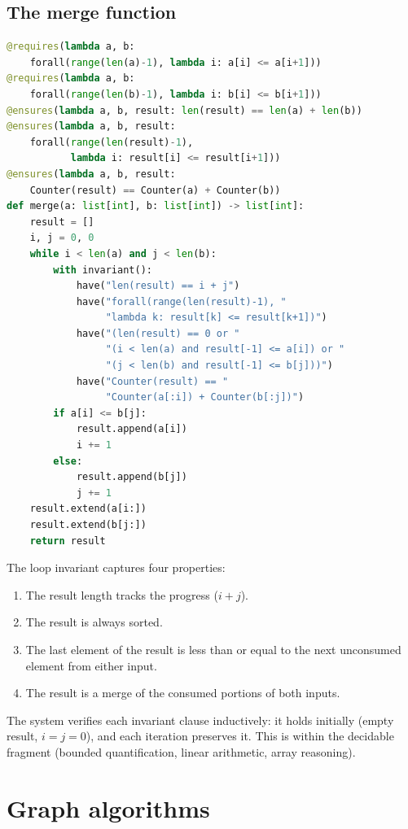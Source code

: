 \documentclass[11pt]{report}
\theoremstyle{definition}
\theoremstyle{plain}
\begin{document}
\subsection{The merge function}

\begin{lstlisting}[style=deppy,language=Python]
@requires(lambda a, b:
    forall(range(len(a)-1), lambda i: a[i] <= a[i+1]))
@requires(lambda a, b:
    forall(range(len(b)-1), lambda i: b[i] <= b[i+1]))
@ensures(lambda a, b, result: len(result) == len(a) + len(b))
@ensures(lambda a, b, result:
    forall(range(len(result)-1),
           lambda i: result[i] <= result[i+1]))
@ensures(lambda a, b, result:
    Counter(result) == Counter(a) + Counter(b))
def merge(a: list[int], b: list[int]) -> list[int]:
    result = []
    i, j = 0, 0
    while i < len(a) and j < len(b):
        with invariant():
            have("len(result) == i + j")
            have("forall(range(len(result)-1), "
                 "lambda k: result[k] <= result[k+1])")
            have("(len(result) == 0 or "
                 "(i < len(a) and result[-1] <= a[i]) or "
                 "(j < len(b) and result[-1] <= b[j]))")
            have("Counter(result) == "
                 "Counter(a[:i]) + Counter(b[:j])")
        if a[i] <= b[j]:
            result.append(a[i])
            i += 1
        else:
            result.append(b[j])
            j += 1
    result.extend(a[i:])
    result.extend(b[j:])
    return result
\end{lstlisting}

The loop invariant captures four properties:
\begin{enumerate}[nosep]
  \item The result length tracks the progress ($i + j$).
  \item The result is always sorted.
  \item The last element of the result is less than or equal to the next
        unconsumed element from either input.
  \item The result is a merge of the consumed portions of both inputs.
\end{enumerate}

The system verifies each invariant clause inductively: it holds initially
(empty result, $i = j = 0$), and each iteration preserves it. This is
within the decidable fragment (bounded quantification, linear arithmetic,
array reasoning).

\section{Graph algorithms}
\end{document}
